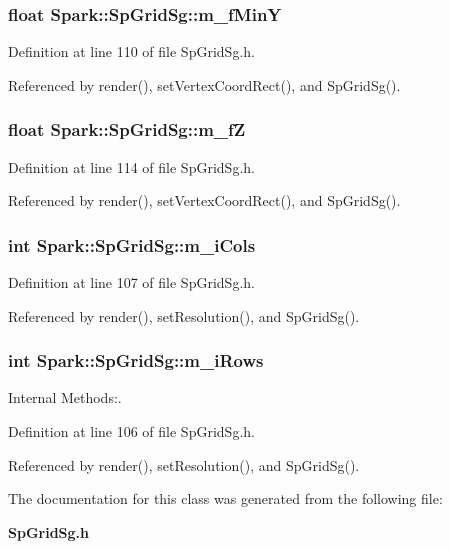 \subsubsection{\setlength{\rightskip}{0pt plus 5cm}float {\bf Spark::Sp\-Grid\-Sg::m\_\-f\-Min\-Y}\hspace{0.3cm}{\tt  [protected]}}\label{classSpark_1_1SpGridSg_p3}


Definition at line 110 of file Sp\-Grid\-Sg.h.

Referenced by render(), set\-Vertex\-Coord\-Rect(), and Sp\-Grid\-Sg().
\subsubsection{\setlength{\rightskip}{0pt plus 5cm}float {\bf Spark::Sp\-Grid\-Sg::m\_\-f\-Z}\hspace{0.3cm}{\tt  [protected]}}\label{classSpark_1_1SpGridSg_p6}


Definition at line 114 of file Sp\-Grid\-Sg.h.

Referenced by render(), set\-Vertex\-Coord\-Rect(), and Sp\-Grid\-Sg().
\subsubsection{\setlength{\rightskip}{0pt plus 5cm}int {\bf Spark::Sp\-Grid\-Sg::m\_\-i\-Cols}\hspace{0.3cm}{\tt  [protected]}}\label{classSpark_1_1SpGridSg_p1}


Definition at line 107 of file Sp\-Grid\-Sg.h.

Referenced by render(), set\-Resolution(), and Sp\-Grid\-Sg().
\subsubsection{\setlength{\rightskip}{0pt plus 5cm}int {\bf Spark::Sp\-Grid\-Sg::m\_\-i\-Rows}\hspace{0.3cm}{\tt  [protected]}}\label{classSpark_1_1SpGridSg_p0}


Internal Methods:. 

Definition at line 106 of file Sp\-Grid\-Sg.h.

Referenced by render(), set\-Resolution(), and Sp\-Grid\-Sg().

The documentation for this class was generated from the following file:\begin{CompactItemize}
\item 
{\bf Sp\-Grid\-Sg.h}\end{CompactItemize}
